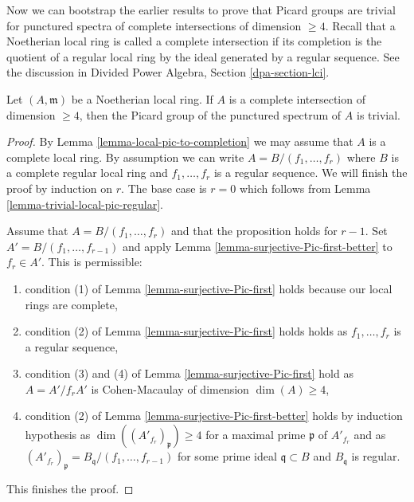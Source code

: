 \noindent
Now we can bootstrap the earlier results to prove that
Picard groups are trivial for punctured spectra
of complete intersections of dimension $\geq 4$.
Recall that a Noetherian local ring is called a complete
intersection if its completion is the quotient of a
regular local ring by the ideal generated by a regular sequence.
See the discussion in Divided Power Algebra, Section \ref{dpa-section-lci}.

\begin{proposition}[Grothendieck]
\label{proposition-trivial-local-pic-complete-intersection}
Let $(A, \mathfrak m)$ be a Noetherian local ring. If $A$ is a
complete intersection of dimension $\geq 4$, then the Picard
group of the punctured spectrum of $A$ is trivial.
\end{proposition}

\begin{proof}
By Lemma \ref{lemma-local-pic-to-completion} we may assume that $A$ is
a complete local ring. By assumption we can write
$A = B/(f_1, \ldots, f_r)$ where $B$ is a complete regular local
ring and $f_1, \ldots, f_r$ is a regular sequence.
We will finish the proof by induction on $r$.
The base case is $r = 0$ which follows from
Lemma \ref{lemma-trivial-local-pic-regular}.

\medskip\noindent
Assume that $A = B/(f_1, \ldots, f_r)$ and that the proposition
holds for $r - 1$. Set $A' = B/(f_1, \ldots, f_{r - 1})$ and apply
Lemma \ref{lemma-surjective-Pic-first-better} to $f_r \in A'$.
This is permissible:
\begin{enumerate}
\item condition (1) of Lemma \ref{lemma-surjective-Pic-first} holds
because our local rings are complete,
\item condition (2) of Lemma \ref{lemma-surjective-Pic-first} holds
holds as $f_1, \ldots, f_r$ is a regular sequence,
\item condition (3) and (4) of Lemma \ref{lemma-surjective-Pic-first} hold
as $A = A'/f_r A'$ is Cohen-Macaulay of dimension $\dim(A) \geq 4$,
\item condition (2) of Lemma \ref{lemma-surjective-Pic-first-better}
holds by induction hypothesis as
$\dim((A'_{f_r})_\mathfrak p) \geq 4$ for a maximal
prime $\mathfrak p$ of $A'_{f_r}$ and as
$(A'_{f_r})_\mathfrak p = B_\mathfrak q/(f_1, \ldots, f_{r - 1})$
for some prime ideal $\mathfrak q \subset B$ and $B_\mathfrak q$ is regular.
\end{enumerate}
This finishes the proof.
\end{proof}











